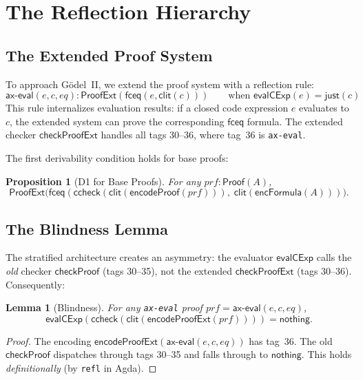\documentclass[11pt]{article}
\newtheorem{lemma}[theorem]{Lemma}
\newtheorem{proposition}[theorem]{Proposition}
\newcommand{\Proof}{\mathsf{Proof}}
\newcommand{\ProofExt}{\mathsf{ProofExt}}
\newcommand{\evalCExp}{\mathsf{evalCExp}}
\newcommand{\checkProof}{\mathsf{checkProof}}
\newcommand{\encFormula}{\mathsf{encFormula}}
\newcommand{\clit}{\mathsf{clit}}
\newcommand{\ccheck}{\mathsf{ccheck}}
\newcommand{\fceq}{\mathsf{fceq}}
\begin{document}
\section{The Reflection Hierarchy}
\label{sec:hierarchy}

\subsection{The Extended Proof System}

To approach G\"odel~II, we extend the proof system with a reflection rule:
\[
  \mathsf{ax\text{-}eval}(e, c, \mathit{eq}) :
    \ProofExt(\fceq(e, \clit(c)))
    \qquad\text{when } \evalCExp(e) = \mathsf{just}(c)
\]
This rule internalizes evaluation results: if a closed code expression
$e$ evaluates to $c$, the extended system can prove the corresponding
$\fceq$ formula. The extended checker $\mathsf{checkProofExt}$ handles
all tags 30--36, where tag~36 is \texttt{ax-eval}.

The first derivability condition holds for base proofs:

\begin{proposition}[D1 for Base Proofs]
  For any $\mathit{prf} : \Proof(A)$,
  \[
    \ProofExt\bigl(\fceq(\ccheck(\clit(\mathsf{encodeProof}(\mathit{prf}))),\;
      \clit(\encFormula(A)))\bigr).
  \]
\end{proposition}

\subsection{The Blindness Lemma}

The stratified architecture creates an asymmetry: the evaluator
$\evalCExp$ calls the \emph{old} checker $\checkProof$ (tags 30--35),
not the extended $\mathsf{checkProofExt}$ (tags 30--36). Consequently:

\begin{lemma}[Blindness]
  \label{lem:blind}
  For any \texttt{ax-eval} proof $\mathit{prf} = \mathsf{ax\text{-}eval}(e, c, \mathit{eq})$,
  \[
    \evalCExp(\ccheck(\clit(\mathsf{encodeProofExt}(\mathit{prf})))) = \mathsf{nothing}.
  \]
\end{lemma}

\begin{proof}
  The encoding $\mathsf{encodeProofExt}(\mathsf{ax\text{-}eval}(e, c, \mathit{eq}))$
  has tag~36. The old $\checkProof$ dispatches through tags 30--35 and
  falls through to $\mathsf{nothing}$. This holds \emph{definitionally}
  (by \texttt{refl} in Agda).
\end{proof}
\end{document}
